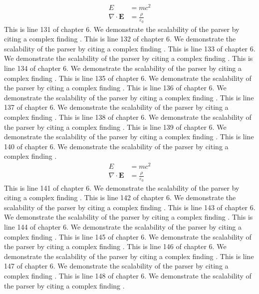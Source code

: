 \begin{align*}
  E &= mc^2 \\
  \nabla \cdot \mathbf{E} &= \frac{\rho}{\varepsilon_0}
\end{align*}
This is line 131 of chapter 6. We demonstrate the scalability of the parser by citing a complex finding \cite{ref6_131}.
This is line 132 of chapter 6. We demonstrate the scalability of the parser by citing a complex finding \cite{ref6_132}.
This is line 133 of chapter 6. We demonstrate the scalability of the parser by citing a complex finding \cite{ref6_133}.
This is line 134 of chapter 6. We demonstrate the scalability of the parser by citing a complex finding \cite{ref6_134}.
This is line 135 of chapter 6. We demonstrate the scalability of the parser by citing a complex finding \cite{ref6_135}.
This is line 136 of chapter 6. We demonstrate the scalability of the parser by citing a complex finding \cite{ref6_136}.
This is line 137 of chapter 6. We demonstrate the scalability of the parser by citing a complex finding \cite{ref6_137}.
This is line 138 of chapter 6. We demonstrate the scalability of the parser by citing a complex finding \cite{ref6_138}.
This is line 139 of chapter 6. We demonstrate the scalability of the parser by citing a complex finding \cite{ref6_139}.
This is line 140 of chapter 6. We demonstrate the scalability of the parser by citing a complex finding \cite{ref6_140}.
\begin{align*}
  E &= mc^2 \\
  \nabla \cdot \mathbf{E} &= \frac{\rho}{\varepsilon_0}
\end{align*}
This is line 141 of chapter 6. We demonstrate the scalability of the parser by citing a complex finding \cite{ref6_141}.
This is line 142 of chapter 6. We demonstrate the scalability of the parser by citing a complex finding \cite{ref6_142}.
This is line 143 of chapter 6. We demonstrate the scalability of the parser by citing a complex finding \cite{ref6_143}.
This is line 144 of chapter 6. We demonstrate the scalability of the parser by citing a complex finding \cite{ref6_144}.
This is line 145 of chapter 6. We demonstrate the scalability of the parser by citing a complex finding \cite{ref6_145}.
This is line 146 of chapter 6. We demonstrate the scalability of the parser by citing a complex finding \cite{ref6_146}.
This is line 147 of chapter 6. We demonstrate the scalability of the parser by citing a complex finding \cite{ref6_147}.
This is line 148 of chapter 6. We demonstrate the scalability of the parser by citing a complex finding \cite{ref6_148}.
